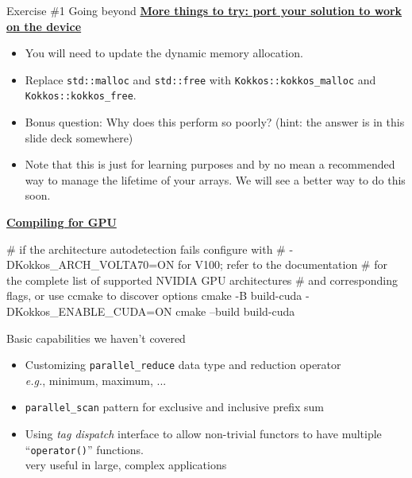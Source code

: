 
\iffull
\begin{frame}[fragile]{Exercise \#1 Going beyond}
   \ul{\textbf{More things to try: port your solution to work on the device}}
   \begin{itemize}
     \item You will need to update the dynamic memory allocation.
     \item Replace \texttt{std::malloc} and \texttt{std::free} with \texttt{Kokkos::kokkos\_malloc} and \texttt{Kokkos::kokkos\_free}.
     \item Bonus question:  Why does this perform so poorly?  (hint: the answer is in this slide deck somewhere)
     \item Note that this is just for learning purposes and by no mean a recommended way to manage the lifetime of your arrays.  We will see a better way to do this soon.
   \end{itemize}

   \ul{\textbf{Compiling for GPU}}
  \vspace{-3pt}
  \begin{small}
  \begin{code}
  # if the architecture autodetection fails configure with
  # -DKokkos_ARCH_VOLTA70=ON for V100; refer to the documentation
  # for the complete list of supported NVIDIA GPU architectures
  # and corresponding flags, or use ccmake to discover options
    cmake -B build-cuda -DKokkos_ENABLE_CUDA=ON
    cmake --build build-cuda
  \end{code}
  \end{small}
\end{frame}
\fi


\iffull
\begin{frame}[fragile]{Basic capabilities we haven't covered}

  \begin{itemize}

  \item {Customizing \texttt{parallel\_reduce} data type and reduction operator
    \\ \hspace{10pt} \emph{e.g.}, minimum, maximum, ...}

  \item {\texttt{parallel\_scan} pattern for exclusive and inclusive prefix sum}

  \item {Using \textit{tag dispatch} interface to allow non-trivial functors to have multiple ``\texttt{operator()}'' functions.
    \\ \hspace{10pt} very useful in large, complex applications}

  \end{itemize}

\end{frame}
\fi

